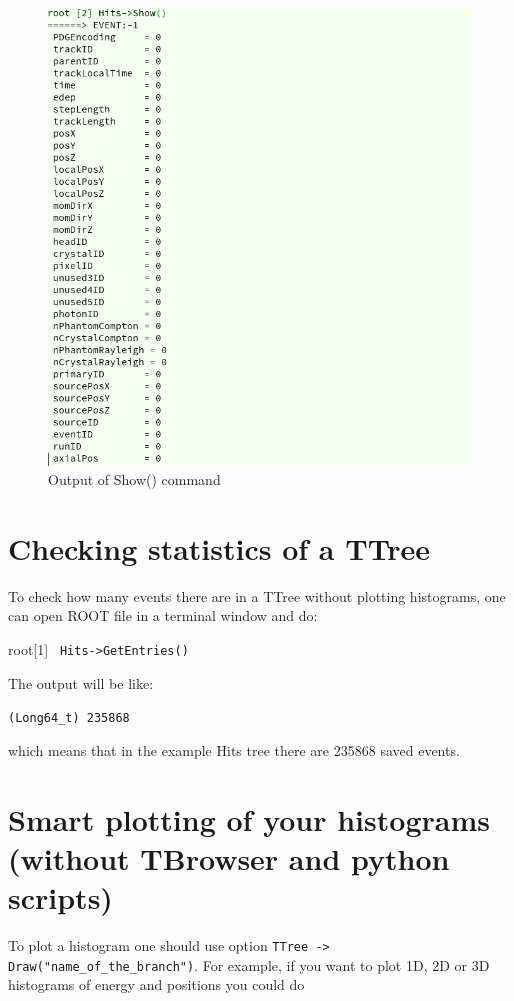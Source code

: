 \documentclass[12pt]{article}
\begin{document}
\begin{figure}[h]
\centering
\includegraphics[scale=0.5]{figs/Show.png}
\caption{Output of Show() command}
\label{fig:Show}
\end{figure}


\section{Checking statistics of a TTree}
To check how many events there are in a TTree without plotting histograms, one can open ROOT file in a terminal window and do:

root[1] \verb| Hits->GetEntries()|

The output will be like: 

\verb|(Long64_t) 235868|

which means that in the example Hits tree there are 235868 saved events.


\section{Smart plotting of your histograms (without TBrowser and python scripts)}
To plot a histogram one should use option \verb|TTree -> Draw("name_of_the_branch")|. For example, if you want to plot 1D, 2D or 3D histograms of energy and positions you could do    
\end{document}
